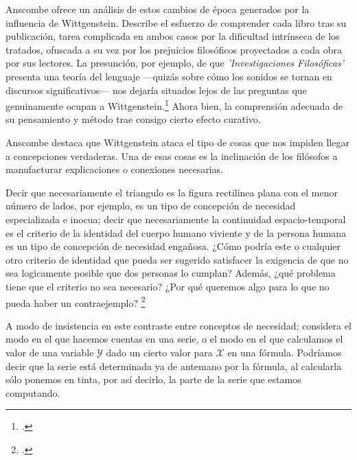 Anscombe ofrece un análisis de estos cambios de época generados por la
influencia de Wittgenstein. Describe el esfuerzo de comprender cada libro tras
su publicación, tarea complicada en ambos casos por la dificultad intrínseca de
los tratados, ofuscada a su vez por los prejuicios filosóficos proyectados a
cada obra por sus lectores. La presunción, por ejemplo, de que
\emph{'Investigaciones Filosóficas'} presenta una teoría del lenguaje ---quizás
sobre cómo los sonidos se tornan en discursos significativos--- nos dejaría
situados lejos de las preguntas que genuinamente ocupan a
Wittgenstein.\footcite[cf.~][p.~183]{twocuts} Ahora bien, la comprensión
adecuada de su pensamiento y método trae consigo cierto efecto curativo.

Anscombe destaca que Wittgenstein ataca el tipo de cosas que nos impiden llegar
a concepciones verdaderas. Una de esas cosas es la inclinación de los filósofos
a manufacturar explicaciones o conexiones necesarias.

Decir que necesariamente el triangulo es la figura rectilinea plana con el menor
número de lados, por ejemplo, es un tipo de concepción de necesidad
especializada e inocua; decir que necesariamente la continuidad espacio-temporal
es el criterio de la identidad del cuerpo humano viviente y de la persona humana
es un tipo de concepción de necesidad engañosa. ¿Cómo podría este o cualquier
otro criterio de identidad que pueda ser sugerido satisfacer la exigencia de que
no sea logicamente posible que dos personas lo cumplan? Además, ¿qué problema
tiene que el criterio no sea necesario? ¿Por qué queremos algo para lo que no
pueda haber un contraejemplo? \footcite[cf.~][p.~184]{twocuts}

A modo de insistencia en este contraste entre conceptos de necesidad; considera
el modo en el que hacemos cuentas en una serie, o el modo en el que calculamos
el valor de una variable $\mathcal{Y}$ dado un cierto valor para $\mathcal{X}$
en una fórmula. Podríamos decir que la serie está determinada ya de antemano por
la fórmula, al calcularla sólo ponemos en tinta, por así decirlo, la parte de la
serie que estamos computando.


